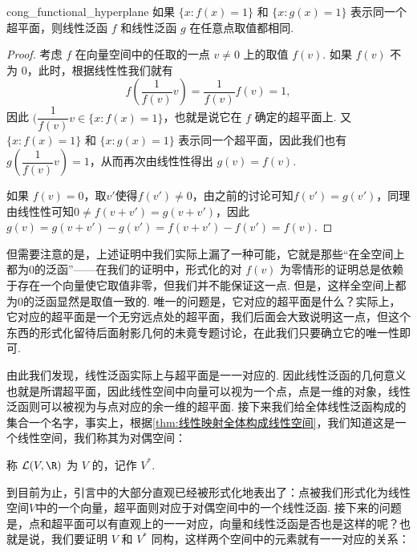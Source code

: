 \begin{lemma}{}{cong_functional_hyperplane}
    如果 $\{x: f(x) = 1\}$ 和 $\{x: g(x) = 1\}$ 表示同一个超平面，则线性泛函 $f$ 和线性泛函 $g$ 在任意点取值都相同.
\end{lemma}

\begin{proof}
    考虑 $f$ 在向量空间中的任取的一点 $v \neq 0$ 上的取值 $f(v)$. 如果 $f(v)$ 不为 $0$，此时，根据线性性我们就有
    \[f(\dfrac{1}{f(v)}v)=\dfrac{1}{f(v)}f(v)=1,\]
    因此 $(\dfrac{1}{f(v)}v \in \{x: f(x) = 1\}$，也就是说它在 $f$ 确定的超平面上. 又$\{x: f(x) = 1\}$ 和 $\{x: g(x) = 1\}$ 表示同一个超平面，因此我们也有 $g(\dfrac{1}{f(v)} v) = 1$，从而再次由线性性得出 $g(v) = f(v)$.

    如果 $f(v)=0$，取$v'$使得$f(v')\neq 0$，由之前的讨论可知$f(v')=g(v')$，同理由线性性可知$0\neq f(v+v')=g(v+v')$，因此$g(v)=g(v+v')-g(v')=f(v+v')-f(v')=f(v)$.
\end{proof}

但需要注意的是，上述证明中我们实际上漏了一种可能，它就是那些``在全空间上都为$0$的泛函''——在我们的证明中，形式化的对 $f(v)$ 为零情形的证明总是依赖于存在一个向量使它取值非零，但我们并不能保证这一点. 但是，这样全空间上都为$0$的泛函显然是取值一致的. 唯一的问题是，它对应的超平面是什么？实际上，它对应的超平面是一个无穷远点处的超平面，我们后面会大致说明这一点，但这个东西的形式化留待后面射影几何的未竟专题讨论，在此我们只要确立它的唯一性即可.

由此我们发现，线性泛函实际上与超平面是一一对应的. 因此线性泛函的几何意义也就是所谓超平面，因此线性空间中向量可以视为一个点，点是一维的对象，线性泛函则可以被视为与点对应的余一维的超平面. 接下来我们给全体线性泛函构成的集合一个名字，事实上，根据\autoref{thm:线性映射全体构成线性空间}，我们知道这是一个线性空间，我们称其为对偶空间：
\begin{definition}{}{}
    称 $\mathcal{L}(V, \R)$ 为 $V$ 的，记作 $V^*$.
\end{definition}

到目前为止，引言中的大部分直观已经被形式化地表出了：点被我们形式化为线性空间$V$中的一个向量，超平面则对应于对偶空间中的一个线性泛函. 接下来的问题是，点和超平面可以有直观上的一一对应，向量和线性泛函是否也是这样的呢？也就是说，我们要证明 $V$ 和 $V^*$ 同构，这样两个空间中的元素就有一一对应的关系：


